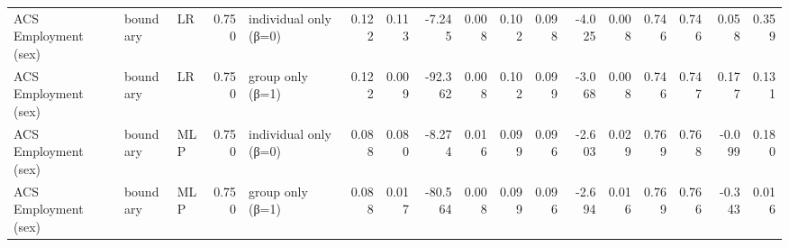 \begin{tabular}{lllrlrrrrrrrrrrrr}
ACS Employment (sex) & boundary & LR & 0.750 & individual only (β=0) & 0.122 & 0.113 & -7.245 & 0.008 & 0.102 & 0.098 & -4.025 & 0.008 & 0.746 & 0.746 & 0.058 & 0.359 \\
ACS Employment (sex) & boundary & LR & 0.750 & group only (β=1) & 0.122 & 0.009 & -92.362 & 0.008 & 0.102 & 0.099 & -3.068 & 0.008 & 0.746 & 0.747 & 0.177 & 0.131 \\
ACS Employment (sex) & boundary & MLP & 0.750 & individual only (β=0) & 0.088 & 0.080 & -8.274 & 0.016 & 0.099 & 0.096 & -2.603 & 0.029 & 0.769 & 0.768 & -0.099 & 0.180 \\
ACS Employment (sex) & boundary & MLP & 0.750 & group only (β=1) & 0.088 & 0.017 & -80.564 & 0.008 & 0.099 & 0.096 & -2.694 & 0.016 & 0.769 & 0.766 & -0.343 & 0.016 \\
\bottomrule
\end{tabular}
